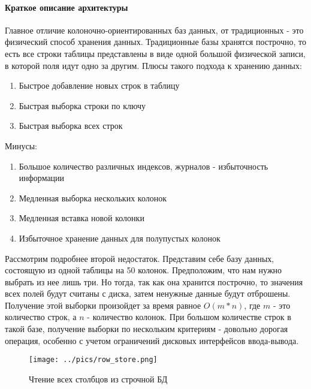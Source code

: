 \documentclass{matmex-diploma}
\begin{document}
        \paragraph{Краткое описание архитектуры}
            Главное отличие колоночно-ориентированных баз данных, от традиционных - это физический способ хранения данных. Традиционные базы хранятся построчно, то есть все строки таблицы представлены в виде одной большой физической записи, в которой поля идут одно за другим.
        Плюсы такого подхода к хранению данных:
        \begin{enumerate}\itemsep1pt \parskip0pt 
            \item Быстрое добавление новых строк в таблицу
            \item Быстрая выборка строки по ключу
            \item Быстрая выборка всех строк
        \end{enumerate}
        Минусы:
        \begin{enumerate}\itemsep1pt \parskip0pt 
            \item Большое количество различных индексов, журналов - избыточность информации
            \item Медленная выборка нескольких колонок
            \item Медленная вставка новой колонки
            \item Избыточное хранение данных для полупустых колонок
        \end{enumerate}
        Рассмотрим подробнее второй недостаток. Представим себе базу данных, состоящую из одной таблицы на 50 колонок. Предположим, что нам нужно выбрать из нее лишь три. Но тогда, так как она хранится построчно, то значения всех полей будут считаны с диска, затем ненужные данные будут отброшены. Получение этой выборки произойдет за время равное $O(m * n)$, где $m$ - это количество строк, а $n$ - количество колонок. При большом количестве строк в такой базе, получение выборки по нескольким критериям - довольно дорогая операция, особенно с учетом ограничений дисковых интерфейсов ввода-вывода. \cite{habr:column_db}
        
        \begin{figure}[h]
            \label{row_store}
            \centering
            \texttt{[image: ../pics/row\_store.png]}
            \caption{Чтение всех столбцов из строчной БД}
        \end{figure}
        
\end{document}
